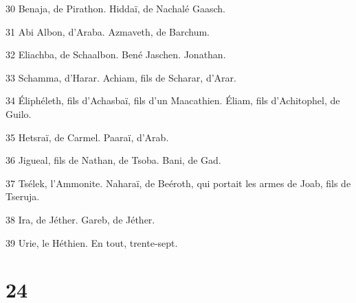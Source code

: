 \par 30 Benaja, de Pirathon. Hiddaï, de Nachalé Gaasch.
\par 31 Abi Albon, d'Araba. Azmaveth, de Barchum.
\par 32 Eliachba, de Schaalbon. Bené Jaschen. Jonathan.
\par 33 Schamma, d'Harar. Achiam, fils de Scharar, d'Arar.
\par 34 Éliphéleth, fils d'Achasbaï, fils d'un Maacathien. Éliam, fils d'Achitophel, de Guilo.
\par 35 Hetsraï, de Carmel. Paaraï, d'Arab.
\par 36 Jigueal, fils de Nathan, de Tsoba. Bani, de Gad.
\par 37 Tsélek, l'Ammonite. Naharaï, de Beéroth, qui portait les armes de Joab, fils de Tseruja.
\par 38 Ira, de Jéther. Gareb, de Jéther.
\par 39 Urie, le Héthien. En tout, trente-sept.

\chapter{24}

